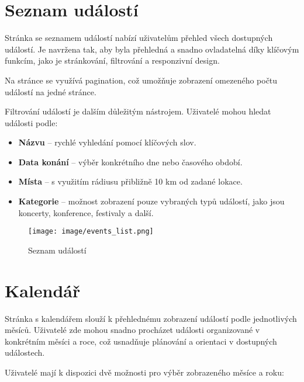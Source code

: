 \documentclass[12pt, a4paper,
twoside,        %
openright
]{report}
\begin{document}
	\clearpage
	
	\section{Seznam událostí}
	
	Stránka se seznamem událostí nabízí uživatelům přehled všech dostupných událostí. Je navržena tak, aby byla přehledná a snadno ovladatelná díky klíčovým funkcím, jako je stránkování, filtrování a responzivní design.
	
	Na stránce se využívá pagination, což umožňuje zobrazení omezeného počtu událostí na jedné stránce.
	
	Filtrování událostí je dalším důležitým nástrojem. Uživatelé mohou hledat události podle:
	
	\begin{itemize}
		\item \textbf{Názvu} – rychlé vyhledání pomocí klíčových slov.
		\item \textbf{Data konání} – výběr konkrétního dne nebo časového období.
		\item \textbf{Místa} – s využitím rádiusu přibližně 10 km od zadané lokace.
		\item \textbf{Kategorie} – možnost zobrazení pouze vybraných typů událostí, jako jsou koncerty, konference, festivaly a další.
	\end{itemize}
	
	\begin{figure}[h!]
		\centering %
		\texttt{[image: image/events\_list.png]} %
		\caption{Seznam událostí} %
		\label{fig:eventslist} %
	\end{figure}
	
	\clearpage
	
	\section{Kalendář}
	
	Stránka s kalendářem slouží k přehlednému zobrazení událostí podle jednotlivých měsíců. Uživatelé zde mohou snadno procházet události organizované v konkrétním měsíci a roce, což usnadňuje plánování a orientaci v dostupných událostech.
	
	Uživatelé mají k dispozici dvě možnosti pro výběr zobrazeného měsíce a roku:
	
\end{document}
